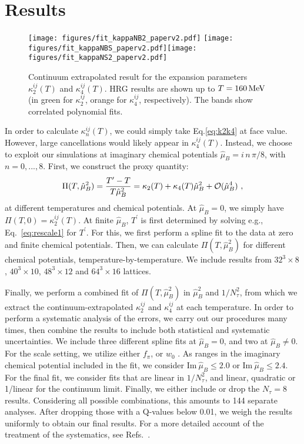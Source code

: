 \documentclass[a4paper,11pt]{article}
\newcommand{\MeV}{\, {\rm MeV}}
\newcommand \hmu {\hat{\mu}}
\newcommand{\calO}{{\cal O}}
\begin{document}
\section{Results}
\label{sec-2}

\begin{figure}
\center
\texttt{[image: figures/fit\_kappaNB2\_paperv2.pdf]}
\texttt{[image: figures/fit\_kappaNBS\_paperv2.pdf]}\texttt{[image: figures/fit\_kappaNS2\_paperv2.pdf]}
\caption{Continuum extrapolated result for the expansion parameters 
$\kappa_2^{ij}(T)$ and $\kappa_4^{ij}(T)$. HRG results are shown up to 
$T=160\MeV$ (in green for $\kappa_2^{ij}$, orange for $\kappa_4^{ij}$,
respectively). The bands show correlated polynomial fits.}
\label{fig:kappaN}
\end{figure}

In order to calculate $\kappa_n^{ij}(T)$, we could simply take Eq.\eqref{eq:k2k4} at face 
value. However, large cancellations would likely appear in $\kappa_4^{ij}(T)$. Instead, we 
choose to exploit our simulations at imaginary chemical potentials 
$\hmu_B = i \, n \, \pi/8$, with $n = 0,...,8$. First, we construct the proxy quantity:
\begin{equation}
\Pi (T, \hmu_B^2) = \frac{T^\prime-T}{T\hmu_B^2} = \kappa_2 (T) + \kappa_4 (T) \hmu_B^2  + \calO (\hmu_B^4) \, \, ,
\end{equation}
at different temperatures and chemical potentials. At $\hmu_B=0$, we simply have 
$\Pi (T, 0) = \kappa_2^{ij}(T)$. At finite $\hmu_B$, $T^\prime$ is first determined by 
solving e.g., Eq.~\eqref{eq:rescale1} for $T^\prime$. For this, we first perform a spline fit 
to the data at zero and finite chemical potentials. 
Then, we can calculate $\Pi (T, \hmu_B^2)$ for different chemical potentials, 
temperature-by-temperature. We include results from $32^3\times8$, $40^3\times10$, 
$48^3\times12$ and $64^3\times16$ lattices.

Finally, we perform a combined fit of $\Pi (T, \hmu_B^2)$ in $\hmu_B^2$ and 
$1/N_\tau^2$, from which we extract the continuum-extrapolated $\kappa_2^{ij}$ and 
$\kappa_4^{ij}$ at each temperature. 
In order to perform a systematic analysis of the errors, we carry out our procedures 
many times, then combine the results to include both statistical and systematic 
uncertainties.  We include three different spline fits at $\hmu_B=0$, and two at 
$\hmu_B \neq 0$. For the scale setting, we utilize either $f_\pi$, or $w_0$
\cite{Borsanyi:2012zs}. As ranges in 
the imaginary chemical potential included in the fit, we consider
$\mathrm{Im}~\hmu_B\le 2.0$ or $\mathrm{Im}~\hmu_B\le 2.4$. 
For the final fit, we consider fits that are linear in $1/N_\tau^2$, and linear, quadratic or 
1/linear for the continuum limit. Finally, we either include or drop the $N_\tau=8$ 
results. Considering all possible combinations, this amounts to 144 separate analyses. 
After dropping those with a Q-values below 0.01, we weigh the results uniformly to 
obtain our final results. For a more detailed account of the treatment of the systematics, 
see Refs.~\cite{Borsanyi:2018grb, Borsanyi:2021sxv}.
\end{document}
